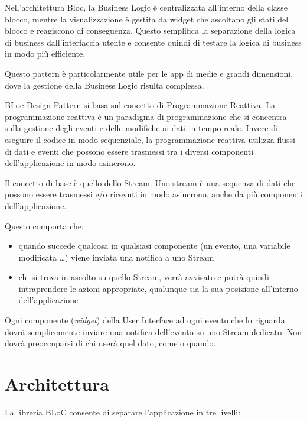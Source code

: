 \documentclass[a4paper, oneside, 12pt]{article}
\begin{document}
Nell'architettura Bloc, la Business Logic è centralizzata all'interno della classe blocco, mentre la visualizzazione è gestita da widget che ascoltano 
gli stati del blocco e reagiscono di conseguenza. Questo semplifica la separazione della logica di business dall'interfaccia utente e consente quindi 
di testare la logica di business in modo più efficiente. 

Questo pattern è particolarmente utile per le app di medie e grandi dimensioni, dove la gestione della Business Logic risulta complessa. 

BLoc Design Pattern si basa sul concetto di Programmazione Reattiva. La programmazione reattiva è un paradigma di programmazione che si concentra 
sulla gestione degli eventi e delle modifiche ai dati in tempo reale. Invece di eseguire il codice in modo sequenziale, la programmazione reattiva 
utilizza flussi di dati e eventi che possono essere trasmessi tra i diversi componenti dell'applicazione in modo asincrono. 

Il concetto di base è quello dello Stream. Uno stream è una sequenza di dati che possono essere trasmessi e/o ricevuti in modo asincrono,
anche da più componenti dell'applicazione.

Questo comporta che:
\begin{itemize}
	\item quando succede qualcosa in qualsiasi componente (un evento, una variabile modificata \ldots) viene inviata una notifica a uno Stream
	\item chi si trova in ascolto su quello Stream, verrà avvisato e potrà quindi intraprendere le azioni appropriate, qualunque sia la sua posizione all'interno dell'applicazione
\end{itemize}

Ogni componente (\textit{widget}) della User Interface ad ogni evento che lo riguarda dovrà semplicemente inviare una notifica dell'evento su uno Stream dedicato. 
Non dovrà preoccuparsi di chi userà quel dato, come o quando.

\newpage
\section{Architettura}
La libreria BLoC consente di separare l'applicazione in tre livelli:
\end{document}
